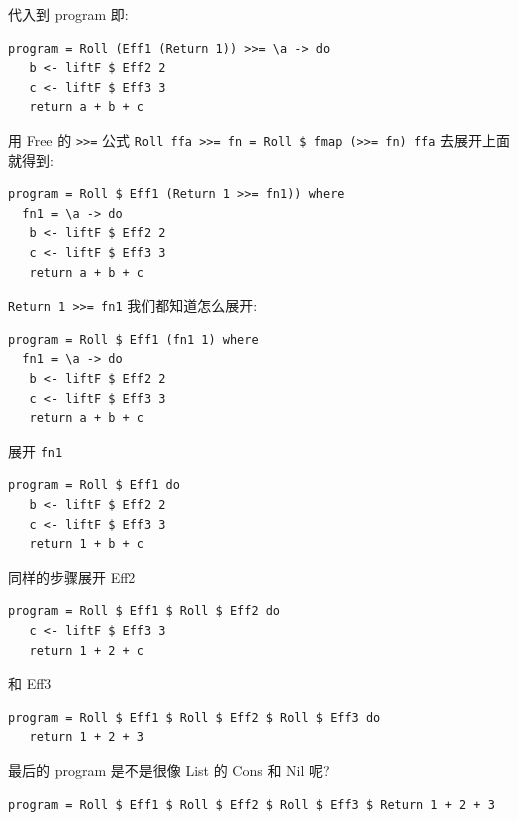 \documentclass[letterspacing]{tufte-book}
\begin{document}
代入到 program 即:
\lstset{language=haskell,label= ,caption= ,captionpos=b,numbers=none}
\begin{lstlisting}
program = Roll (Eff1 (Return 1)) >>= \a -> do
   b <- liftF $ Eff2 2
   c <- liftF $ Eff3 3
   return a + b + c
\end{lstlisting}

用 Free 的 \texttt{>>=} 公式 \texttt{Roll ffa >>= fn = Roll \$ fmap (>>= fn) ffa} 去展开上面就得到:

\lstset{language=haskell,label= ,caption= ,captionpos=b,numbers=none}
\begin{lstlisting}
program = Roll $ Eff1 (Return 1 >>= fn1)) where
  fn1 = \a -> do
   b <- liftF $ Eff2 2
   c <- liftF $ Eff3 3
   return a + b + c
\end{lstlisting}

\texttt{Return 1 >>= fn1} 我们都知道怎么展开:

\lstset{language=haskell,label= ,caption= ,captionpos=b,numbers=none}
\begin{lstlisting}
program = Roll $ Eff1 (fn1 1) where
  fn1 = \a -> do
   b <- liftF $ Eff2 2
   c <- liftF $ Eff3 3
   return a + b + c
\end{lstlisting}

展开 \texttt{fn1}

\lstset{language=haskell,label= ,caption= ,captionpos=b,numbers=none}
\begin{lstlisting}
program = Roll $ Eff1 do
   b <- liftF $ Eff2 2
   c <- liftF $ Eff3 3
   return 1 + b + c
\end{lstlisting}


同样的步骤展开 Eff2
\lstset{language=haskell,label= ,caption= ,captionpos=b,numbers=none}
\begin{lstlisting}
program = Roll $ Eff1 $ Roll $ Eff2 do
   c <- liftF $ Eff3 3
   return 1 + 2 + c
\end{lstlisting}

和 Eff3

\lstset{language=haskell,label= ,caption= ,captionpos=b,numbers=none}
\begin{lstlisting}
program = Roll $ Eff1 $ Roll $ Eff2 $ Roll $ Eff3 do
   return 1 + 2 + 3
\end{lstlisting}

最后的 program 是不是很像 List 的 Cons 和 Nil 呢?

\lstset{language=haskell,label= ,caption= ,captionpos=b,numbers=none}
\begin{lstlisting}
program = Roll $ Eff1 $ Roll $ Eff2 $ Roll $ Eff3 $ Return 1 + 2 + 3
\end{lstlisting}
\end{document}
